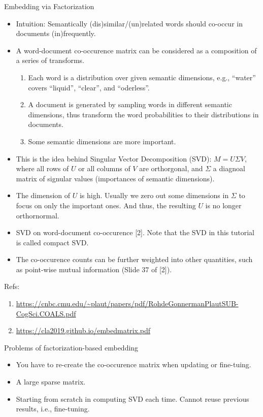 \documentclass[10pt]{beamer}
\begin{document}
\begin{frame}{Embedding via Factorization}
\begin{itemize}[<+->]
  \item Intuition: Semantically (dis)similar/(un)related words should co-occur in documents (in)frequently.
  \item A word-document co-occurence matrix can be considered as a composition 
   of a series of transforms. 
       \begin{enumerate}
         \item Each word is a distribution over given semantic dimensions, e.g., ``water'' covers ``liquid'', ``clear'', and ``oderless''.
         \item A document is generated by sampling words in different semantic dimensions, thus transform the word probabilities to their distributions in documents. 
         \item Some semantic dimensions are more important. 
       \end{enumerate}
  \item This is the idea behind Singular Vector Decomposition (SVD): $M = U\Sigma V$, where all rows of $U$ or all columns of $V$ are orthorgonal, and $\Sigma$ a diagnoal matrix of signular values (importances of semantic dimensions). 
  \item The dimension of $U$ is high. Usually we zero out some dimensions in $\Sigma$ to focus on only the important ones. And thus, the resulting $U$ is no longer orthornormal. 
  \item SVD on word-document co-occurence [2].  Note that the SVD in this tutorial is called compact SVD. 

  \item The co-occurence counts can be further weighted into other quantities, such as point-wise mutual information (Slide 37 of [2]). 
\end{itemize}

Refs: 
\begin{enumerate}
\item \url{https://cnbc.cmu.edu/~plaut/papers/pdf/RohdeGonnermanPlautSUB-CogSci.COALS.pdf}
\item  \url{https://cla2019.github.io/embedmatrix.pdf}
\end{enumerate}
\end{frame}
   

\begin{frame}{Problems of factorization-based embedding}
\begin{itemize}[<+->]
  \item You have to re-create the co-occurence matrix when updating or fine-tuing. 
  \item A large sparse matrix. 
  \item Starting from scratch in computing SVD each time. Cannot reuse previous results, i.e., fine-tuning. 
\end{itemize}
\end{frame}
\end{document}

